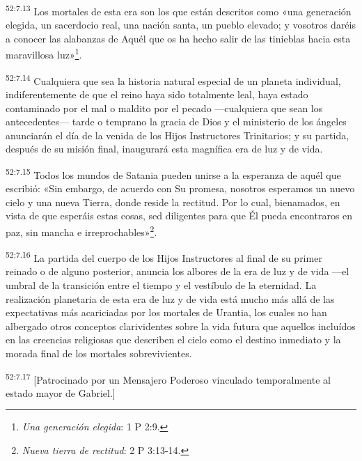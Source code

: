 \par
\textsuperscript{52:7.13} Los mortales de esta era son los que están descritos como «una generación elegida, un sacerdocio real, una nación santa, un pueblo elevado; y vosotros daréis a conocer las alabanzas de Aquél que os ha hecho salir de las tinieblas hacia esta maravillosa luz»\footnote{\textit{Una generación elegida}: 1 P 2:9.}.

\par
\textsuperscript{52:7.14} Cualquiera que sea la historia natural especial de un planeta individual, indiferentemente de que el reino haya sido totalmente leal, haya estado contaminado por el mal o maldito por el pecado ---cualquiera que sean los antecedentes--- tarde o temprano la gracia de Dios y el ministerio de los ángeles anunciarán el día de la venida de los Hijos Instructores Trinitarios; y su partida, después de su misión final, inaugurará esta magnífica era de luz y de vida.

\par
\textsuperscript{52:7.15} Todos los mundos de Satania pueden unirse a la esperanza de aquél que escribió: «Sin embargo, de acuerdo con Su promesa, nosotros esperamos un nuevo cielo y una nueva Tierra, donde reside la rectitud. Por lo cual, bienamados, en vista de que esperáis estas cosas, sed diligentes para que Él pueda encontraros en paz, sin mancha e irreprochables»\footnote{\textit{Nueva tierra de rectitud}: 2 P 3:13-14.}.

\par
\textsuperscript{52:7.16} La partida del cuerpo de los Hijos Instructores al final de su primer reinado o de alguno posterior, anuncia los albores de la era de luz y de vida ---el umbral de la transición entre el tiempo y el vestíbulo de la eternidad. La realización planetaria de esta era de luz y de vida está mucho más allá de las expectativas más acariciadas por los mortales de Urantia, los cuales no han albergado otros conceptos clarividentes sobre la vida futura que aquellos incluídos en las creencias religiosas que describen el cielo como el destino inmediato y la morada final de los mortales sobrevivientes.

\par
\textsuperscript{52:7.17} [Patrocinado por un Mensajero Poderoso vinculado temporalmente al estado mayor de Gabriel.]